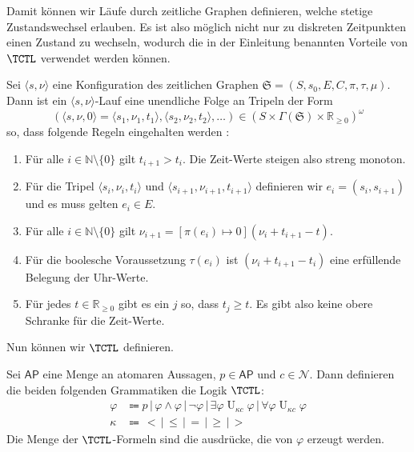 Damit können wir Läufe durch zeitliche Graphen definieren, welche stetige Zustandswechsel erlauben. 
Es ist also möglich nicht nur zu diskreten Zeitpunkten einen Zustand zu wechseln, wodurch die in der Einleitung benannten Vorteile von $\TCTL$ verwendet werden können.

\begin{definition}
	Sei $\langle s,\nu \rangle$ eine Konfiguration des zeitlichen Graphen $\mathfrak{S}=(S,s_0,E,C,\pi,\tau,\mu)$. Dann ist ein $\langle s,\nu \rangle$-Lauf eine unendliche Folge an Tripeln der Form 
	$$(\langle s,\nu,0\rangle = \langle s_1,\nu_1,t_1\rangle,\langle s_2,\nu_2,t_2\rangle,\dots)\in (S\times \Gamma(\mathfrak{S})\times \mathbb{R}_{\geq 0})^\omega$$ 
	so, dass folgende Regeln eingehalten werden \cite{alur1990model}:
	\begin{enumerate}
		\item Für alle $i\in \mathbb{N}\setminus\{0\}$ gilt $t_{i+1}>t_i$. Die Zeit-Werte steigen also streng monoton.
		\item Für die Tripel $\langle s_i,\nu_i,t_i\rangle$ und $\langle s_{i+1},\nu_{i+1},t_{i+1}\rangle$ definieren wir $e_i=(s_i,s_{i+1})$ und es muss gelten $e_i\in E$.
		\item Für alle $i\in \mathbb{N}\setminus \{0\}$ gilt $\nu_{i+1}=[\pi(e_i)\mapsto 0](\nu_i+t_{i+1}-t)$.
		\item Für die boolesche Voraussetzung $\tau(e_i)$ ist $(\nu_i + t_{i+1}-t_i)$ eine erfüllende Belegung der Uhr-Werte.
		\item Für jedes $t\in \mathbb{R}_{\geq 0}$ gibt es ein $j$ so, dass $t_j\geq t$. Es gibt also keine obere Schranke für die Zeit-Werte.
	\end{enumerate}
\end{definition}

Nun können wir $\TCTL$ definieren.

\begin{definition}
	Sei $\mathsf{AP}$ eine Menge an atomaren Aussagen, $p\in \mathsf{AP}$ und $c\in \mathcal{N}$. Dann definieren die beiden folgenden Grammatiken die Logik $\TCTL$:
	\begin{align*}
		\varphi &\Coloneqq p \,|\, \varphi \land \varphi \,|\, \neg\varphi \,|\, \exists\varphi \operatorname{U}_{\kappa c}\varphi \,|\, \forall\varphi \operatorname{U}_{\kappa c}\varphi \\
		\kappa &\Coloneqq \, < \,|\, \leq \,|\, = \,|\, \geq \,|\, >
	\end{align*}
	Die Menge der $\TCTL$-Formeln sind die ausdrücke, die von $\varphi$ erzeugt werden. \cite{alur1990model}
\end{definition}

